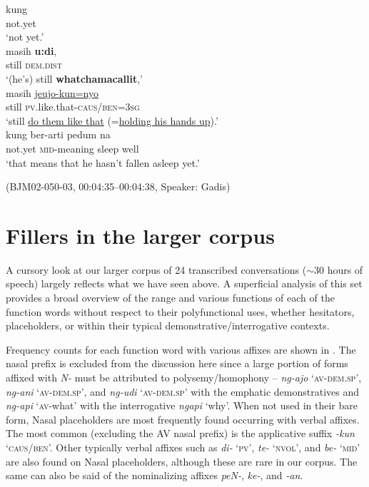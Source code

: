 \documentclass[output=paper,colorlinks,citecolor=brown
\ChapterDOI{10.5281/zenodo.15697585}
]{langscibook}
\begin{document}
\begin{exe}
    \ex\label{ex:place-no-kun-obj-pv} \begin{xlist}[0\quad →A:]
         \gll
        kung \\
        not.yet \\
        \glt `not yet.' \\
         \gll
        masih \textbf{u:di}, \\
        still \textsc{dem.dist} \\
        \glt `(he's) still \textbf{whatchamacallit},' \\
        \exi{3\quad \hphantom{→G:}} \gll
        masih \uline{jeujo-kun=nyo} \\
        still \textsc{pv}.like.that-\textsc{caus/ben}=3\textsc{sg} \\
        \glt `still \uline{do them like that} (=\uline{holding his hands up}).' \\
        \exi{4\quad \hphantom{→G:}} \gll
        kung ber-arti pedum na \\
        not.yet \textsc{mid}-meaning sleep well \\
        \glt `that means that he hasn't fallen asleep yet.' \\
    \end{xlist}
    \hfill (BJM02-050-03, 00:04:35–00:04:38, Speaker: Gadis) 
\end{exe}

\section{Fillers in the larger corpus}\label{sec:Fillers in the larger corpus}
A cursory look at our larger corpus of 24 transcribed conversations ($\sim$30 hours of speech) largely reflects what we have seen above. A superficial analysis of this set provides a broad overview of the range and various functions of each of the function words without respect to their polyfunctional uses, whether hesitators, placeholders, or within their typical demonstrative/interrogative contexts.

Frequency counts for each function word with various affixes are shown in . The nasal prefix is excluded from the discussion here since a large portion of forms affixed with \textit{N-} must be attributed to polysemy/homophony – \textit{ng-ajo} `\textsc{av-dem.sp}', \textit{ng-ani} `\textsc{av-dem.sp}', and \textit{ng-udi} `\textsc{av-dem.sp}' with the emphatic demonstratives and \textit{ng-api} `\textsc{av-}what' with the interrogative \textit{ngapi} `why'. When not used in their bare form, Nasal placeholders are most frequently found occurring with verbal affixes. The most common (excluding the AV nasal prefix) is the applicative suffix \textit{-kun} `\textsc{caus/ben}'. Other typically verbal affixes such as \textit{di-} `\textsc{pv}', \textit{te-} `\textsc{nvol}', and \textit{be-} `\textsc{mid}' are also found on Nasal placeholders, although these are rare in our corpus. The same can also be said of the nominalizing affixes \textit{peN-}, \textit{ke-}, and \textit{-an}.
\end{document}
